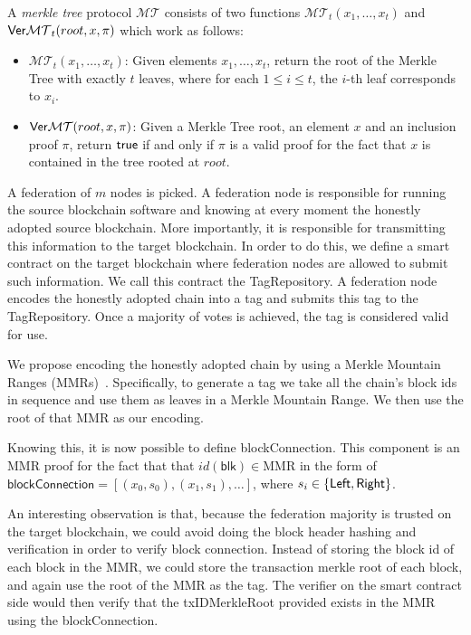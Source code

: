 \begin{definition}
  A \emph{merkle tree} protocol $\mathcal{MT}$ consists of two functions $\mathcal{MT}_t(x_1, \dots, x_t)$ and $\mathsf{Ver}\mathcal{MT}_t(root, x, \pi)$ which work as follows:

  \begin{itemize}
    \item $\mathcal{MT}_t(x_1, \dots, x_t)$: Given elements $x_1, \dots, x_t$, return the root of the Merkle Tree with exactly $t$ leaves, where for each $1 \le i \le t$, the $i$-th leaf corresponds to $x_i$.

    \item $\mathsf{Ver}\mathcal{MT}(root, x, \pi)$: Given a Merkle Tree root, an element $x$ and an inclusion proof $\pi$, return $\sf{true}$ if and only if $\pi$ is a valid proof for the fact that $x$ is contained in the tree rooted at $root$.
  \end{itemize}
\end{definition}

A federation of $m$ nodes is picked. A federation node is responsible for running the source blockchain software and knowing at every moment the honestly adopted source blockchain. More importantly, it is responsible for transmitting this information to the target blockchain. In order to do this, we define a smart contract on the target blockchain where federation nodes are allowed to submit such information. We call this contract the \textsf{TagRepository}. A federation node encodes the honestly adopted chain into a tag and submits this tag to the \textsf{TagRepository}. Once a majority of votes is achieved, the tag is considered valid for use.

We propose encoding the honestly adopted chain by using a Merkle Mountain Ranges (MMRs)~\cite{flyclient}. Specifically, to generate a tag we take all the chain's block ids in sequence and use them as leaves in a Merkle Mountain Range. We then use the root of that MMR as our encoding.

Knowing this, it is now possible to define \textsf{blockConnection}. This component is an MMR proof for the fact that that $id(\mathsf{blk}) \in \text{MMR}$ in the form of $\mathsf{blockConnection} = [(x_0, s_0), (x_1, s_1), \dots]$, where $s_i \in \sf\{Left, Right\}$.

An interesting observation is that, because the federation majority is trusted on the target blockchain, we could avoid doing the block header hashing and verification in order to verify block connection. Instead of storing the block id of each block in the MMR, we could store the transaction merkle root of each block, and again use the root of the MMR as the tag. The verifier on the smart contract side would then verify that the \textsf{txIDMerkleRoot} provided exists in the MMR using the \textsf{blockConnection}.


